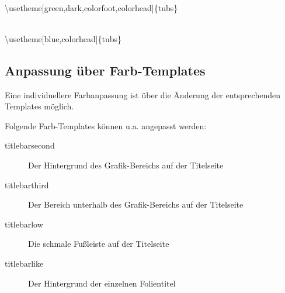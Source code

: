 \begin{center}
\begin{minipage}{0.49\textwidth}
\end{minipage}
\begin{minipage}{0.49\textwidth}
\end{minipage}\medskip\\
{\ttfamily \textbackslash usetheme[green,dark,colorfoot,colorhead]\{tubs\}}
\end{center}

\begin{center}
\begin{minipage}{0.49\textwidth}
\end{minipage}
\begin{minipage}{0.49\textwidth}
\end{minipage}\medskip\\
{\ttfamily%
  \textbackslash usetheme[blue,colorhead]\{tubs\}}
\end{center}

\clearpage
\subsection{Anpassung über Farb-Templates}

Eine individuellere Farbanpassung ist über die Änderung der entsprechenden
Templates möglich.

Folgende Farb-Templates können u.a. angepasst werden:
\begin{description}
  \item[\color{tuRed100}\ttfamily titlebarsecond]
    Der Hintergrund des Grafik-Bereichs auf der Titelseite
  \item[\color{tuRed100}\ttfamily titlebarthird]
    Der Bereich unterhalb des Grafik-Bereichs auf der Titelseite
  \item[\color{tuRed100}\ttfamily titlebarlow]
    Die schmale Fußleiste auf der Titelseite
  \item[\color{tuRed100}\ttfamily titlebarlike]
    Der Hintergrund der einzelnen Folientitel
\end{description}

